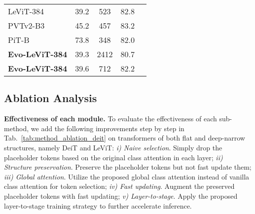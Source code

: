 \documentclass[letterpaper]{article} \usepackage{aaai22}  \usepackage{times}  \usepackage{helvet}  \usepackage{courier}  \usepackage[hyphens]{url}  \usepackage{graphicx} \urlstyle{rm} \def\UrlFont{\rm}  \usepackage{natbib}  \usepackage{caption} \DeclareCaptionStyle{ruled}{labelfont=normalfont,labelsep=colon,strut=off} \frenchspacing  \setlength{\pdfpagewidth}{8.5in}  \setlength{\pdfpageheight}{11in}  \usepackage{algorithm}
\begin{document}
\begin{table}[t]
{{\begin{tabular}{l|cccc}
    LeViT-384 &     39.2          &   523     &     82.8      \\
    PVTv2-B3      &    45.2          &      457     &     83.2      \\
PiT-B    &     73.8           &    348       &      82.0         \\ \midrule
\textbf{Evo-LeViT-384}  &     39.3          &    2412    &     80.7      \\
    \textbf{Evo-LeViT-384}  &     39.6          &    712    &   82.2        \\
    \bottomrule
    \end{tabular}
    }
    }
    \vspace{-3mm}
\end{table}
%
 \subsection{Ablation Analysis}
\textbf{Effectiveness of each module.}
To evaluate the effectiveness of each sub-method, we add the following improvements step by step in Tab.~\ref{tab:method_ablation_deit} on transformers of both flat and deep-narrow structures, namely DeiT and LeViT:
\textit{i) Naive selection}. Simply drop the placeholder tokens based on the original class attention in each layer;
\textit{ii) Structure preservation}. Preserve the placeholder tokens but not fast update them;
\textit{iii) Global attention}. Utilize the proposed global class attention instead of vanilla class attention for token selection;
\textit{iv) Fast updating}. Augment the preserved placeholder tokens with fast updating;
\textit{v) Layer-to-stage}. Apply the proposed layer-to-stage training strategy to further accelerate inference.
\end{document}
